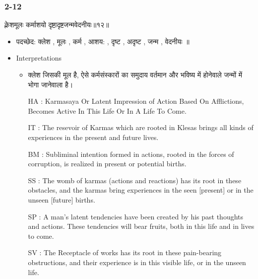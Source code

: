 \begin{frame}[fragile]\frametitle{2-12}
\begin{sanskrit}
क्लेशमूलः कर्माशयो दृष्टादृष्टजन्मवेदनीयः॥१२॥
\end{sanskrit}

	\begin{itemize}
	\item पदच्छेद: क्लेश , मूलः , कर्म , आशय: , दृष्ट , अदृष्ट , जन्म , वेदनीयः ॥
	\item Interpretations
		\begin{itemize}
		\item क्लेश जिसकी मूल है, ऐसे कर्मसंस्कारों का समुदाय वर्तमान और भविष्य में होनेवाले जन्मों में भोगा जानेवाला है।
		\item [HA]: Karmasaya Or Latent Impression of Action Based On Afflictions, Becomes Active In This Life Or In A Life To Come.
		\item [IT]: The resevoir of Karmas which are rooted in Klesas brings all kinds of experiences in the present and future lives.
		\item [BM]: Subliminal intention formed in actions, rooted in the forces of corruption, is realized in present or potential births.
		\item [SS]: The womb of karmas (actions and reactions) has its root in these obstacles, and the karmas bring experiences in the seen [present] or in the unseen [future] births.
		\item [SP]: A man’s latent tendencies have been created by his past thoughts and actions. These tendencies will bear fruits, both in this life and in lives to come.
		\item [SV]: The Receptacle of works has its root in these pain-bearing obstructions, and their experience is in this visible life, or in the unseen life. 
		\end{itemize}
	\end{itemize}
	
\end{frame}


